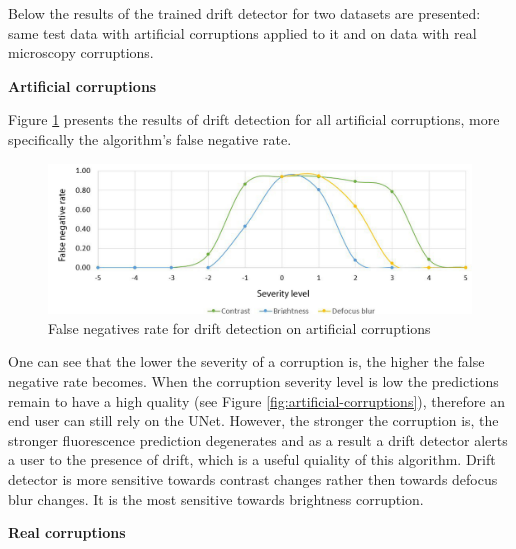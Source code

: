 Below the results of the trained drift detector for two datasets are presented: same test data with artificial corruptions applied to it and on data with real microscopy corruptions. 

\textbf{Artificial corruptions}

Figure \ref{fig:fn-rate} presents the results of drift detection for all artificial corruptions, more specifically the algorithm's false negative rate.
\begin{figure}[htb]
	\begin{center}
		\includegraphics[width=\linewidth]{bilder/drift-detection/fn-rate.png}
		\caption[False negatives rate for drift detection on artificial corruptions]%
		{False negatives rate for drift detection on artificial corruptions}\label{fig:fn-rate}
	\end{center}
\end{figure}
One can see that the lower the severity of a corruption is, the higher the false negative rate becomes. When the corruption severity level is low the predictions remain to have a high quality (see Figure \ref{fig:artificial-corruptions}), therefore an end user can still rely on the UNet. However, the stronger the corruption is, the stronger fluorescence prediction degenerates and as a result a drift detector alerts a user to the presence of drift, which is a useful quiality of this algorithm. Drift detector is more sensitive towards contrast changes rather then towards defocus blur changes. It is the most sensitive towards brightness corruption.

\textbf{Real corruptions}

